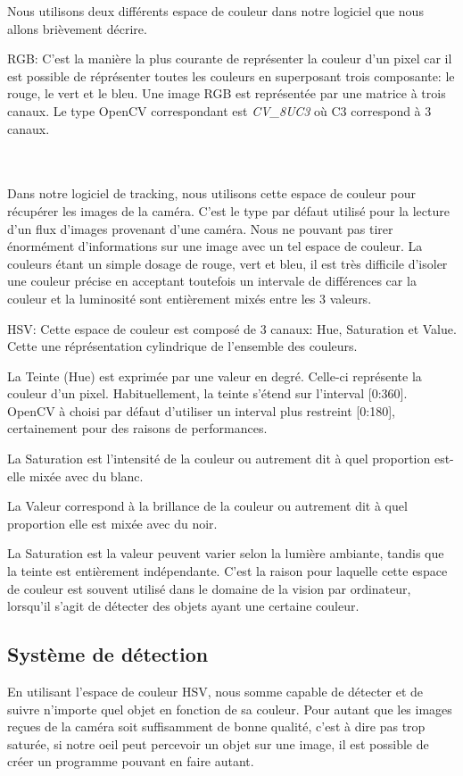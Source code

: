 \documentclass[11pt,a4paper,oldfontcommands]{memoir}
\begin{document}
Nous utilisons deux différents espace de couleur dans notre logiciel que nous allons brièvement décrire.


RGB: C'est la manière la plus courante de représenter la couleur d'un pixel car il est possible de réprésenter toutes les couleurs en superposant trois composante: le rouge, le vert et le bleu. Une image RGB est représentée par une matrice à trois canaux. Le type OpenCV correspondant est \textit{CV\_8UC3} où C3 correspond à 3 canaux.

\\\\Dans notre logiciel de tracking, nous utilisons cette espace de couleur pour récupérer les images de la caméra. C'est le type par défaut utilisé pour la lecture d'un flux d'images provenant d'une caméra. Nous ne pouvant pas tirer énormément d'informations sur une image avec un tel espace de couleur. La couleurs étant un simple dosage de rouge, vert et bleu, il est très difficile d'isoler une couleur précise en acceptant toutefois un intervale de différences car la couleur et la luminosité sont entièrement mixés entre les 3 valeurs.

HSV: Cette espace de couleur est composé de 3 canaux: Hue, Saturation et Value. Cette une réprésentation cylindrique de l'ensemble des couleurs.

La Teinte (Hue) est exprimée par une valeur en degré. Celle-ci représente la couleur d'un pixel. Habituellement, la teinte s'étend sur l'interval [0:360]. OpenCV à choisi par défaut d'utiliser un interval plus restreint [0:180], certainement pour des raisons de performances.

La Saturation est l'intensité de la couleur ou autrement dit à quel proportion est-elle mixée avec du blanc.

La Valeur correspond à la brillance de la couleur ou autrement dit à quel proportion elle est mixée avec du noir.

La Saturation est la valeur peuvent varier selon la lumière ambiante, tandis que la teinte est entièrement indépendante. C'est la raison pour laquelle cette espace de couleur est souvent utilisé dans le domaine de la vision par ordinateur, lorsqu'il s'agit de détecter des objets ayant une certaine couleur.


\subsection{Système de détection}

En utilisant l'espace de couleur HSV, nous somme capable de détecter et de suivre n'importe quel objet en fonction de sa couleur. Pour autant que les images reçues de la caméra soit suffisamment de bonne qualité, c'est à dire pas trop saturée, si notre oeil peut percevoir un objet sur une image, il est possible de créer un programme pouvant en faire autant.
\end{document}
